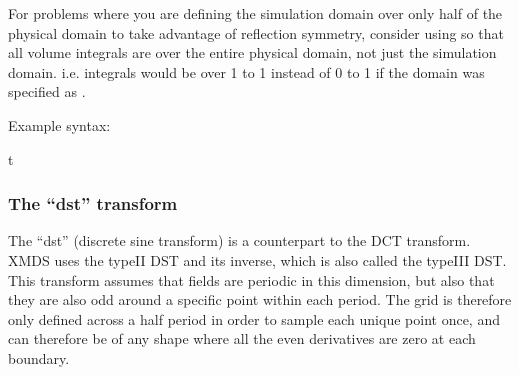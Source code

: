 \documentclass[letterpaper,10pt,english]{sphinxmanual}
\begin{document}
\sphinxAtStartPar
For problems where you are defining the simulation domain over only half of the physical domain to take advantage of reflection symmetry, consider using  so that all volume integrals are over the entire physical domain, not just the simulation domain. i.e. integrals would be over \sphinxhyphen{}1 to 1 instead of 0 to 1 if the domain was specified as .

\sphinxAtStartPar
Example syntax:

\begin{sphinxVerbatim}[commandchars=\\\{\}]
 
         t 
                 
                  
\end{sphinxVerbatim}

\ignorespaces 

\subsubsection{The “dst” transform}
\label{\detokenize{reference_elements:the-dst-transform}}\label{\detokenize{reference_elements:dst-transform}}\label{\detokenize{reference_elements:index-37}}
\sphinxAtStartPar
The “dst” (discrete sine transform) is a counterpart to the DCT transform.  XMDS uses the type\sphinxhyphen{}II DST and its inverse, which is also called the type\sphinxhyphen{}III DST.  This transform assumes that fields are periodic in this dimension, but also that they are also odd around a specific point within each period.  The grid is therefore only defined across a half period in order to sample each unique point once, and can therefore be of any shape where all the even derivatives are zero at each boundary.
\end{document}
